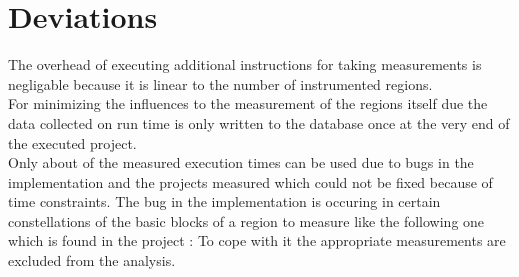 \section{Deviations}
The overhead of executing additional instructions for taking measurements is negligable because it is linear to the number of instrumented regions. \\
For minimizing the influences to the measurement of the regions itself due the data collected on run time is only written to the database once at the very end of the executed project.\\
Only about  of the measured execution times can be used due to bugs in the implementation and the projects measured which could not be fixed because of time constraints.
The bug in the implementation is occuring in certain constellations of the basic blocks of a region to measure like the following one which is found in the project :
To cope with it the appropriate measurements are excluded from the analysis.
